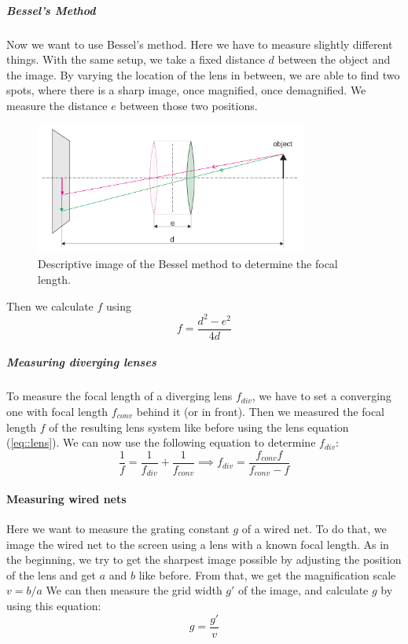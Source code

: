 \subparagraph{Bessel's Method}
\label{chap::bessel}
Now we want to use Bessel's method.
Here we have to measure slightly different things.
With the same setup, we take a fixed distance $d$ between the object and the image. 
By varying the location of the lens in between, we are able to find two spots, where there is a sharp image, once magnified, once demagnified.
We measure the distance $e$ between those two positions.
\begin{figure}[h!]
	\centering
	\includegraphics[width=0.8\textwidth]{img/bessel.PNG}
	\caption{Descriptive image\cite{manual} of the Bessel method to determine the focal length.}
	\label{fig::bessel}
\end{figure}
 Then we calculate $f$ using
\begin{equation}
	f = \frac{d^2 - e^2}{4d}
\end{equation}


\subparagraph{Measuring diverging lenses}
\label{chap::div}
To measure the focal length of a diverging lens $f_{div}$, we have to set a converging one with focal length $f_{conv}$ behind it (or in front). 
Then we measured the focal length $f$ of the resulting lens system like before using the lens equation (\ref{eq::lens}).
We can now use the following equation to determine $f_{div}$:
\begin{equation}
	\frac{1}{f} = \frac{1}{f_{div}} + \frac{1}{f_{conv}} \implies f_{div} = \frac{f_{conv} f}{f_{conv} - f}
	\label{eq::div}
\end{equation}


\paragraph{Measuring wired nets}
\label{chap::net}
Here we want to measure the grating constant $g$ of a wired net.
To do that, we image the wired net to the screen using a lens with a known focal length.
As in the beginning, we try to get the sharpest image possible by adjusting the position of the lens and get $a$ and $b$ like before.
From that, we get the magnification scale $v = b/a$
We can then measure the grid width $g'$ of the image, and calculate $g$ by using this equation:
\begin{equation}
	g = \frac{g'}{v}
	\label{eq::grid}
\end{equation}


